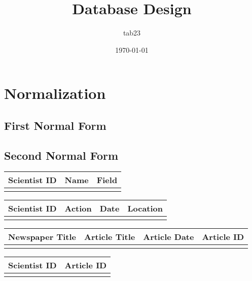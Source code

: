 \documentclass[draft]{article}
\title{Database Design}
\author{tab23}
\date{\today}
\begin{document}
\section{Normalization}
\subsection{First Normal Form}
\begin{table}[H]
\noindent{}
\end{table}

\subsection{Second Normal Form}

\begin{table}[H]
\begin{tabular}{|l|l|l|}
\hline
Scientist ID & Name & Field \\ \hline
             &     	&  \\ \hline
\end{tabular}
\end{table}

\begin{table}[H]
\begin{tabular}{|l|l|l|l|}
\hline
Scientist ID & Action & Date & Location \\ \hline
	& 		 & 		& \\ \hline
\end{tabular}
\end{table}

\begin{table}[H]
\begin{tabular}{|l|l|l|l|}
\hline
Newspaper Title & Article Title & Article Date & Article ID \\ \hline
                &               &              &            \\ \hline
\end{tabular}
\end{table}

\begin{table}[H]
\begin{tabular}{|l|l|}
\hline
Scientist ID & Article ID \\ \hline
             &            \\ \hline
\end{tabular}
\end{table}
\end{document}
